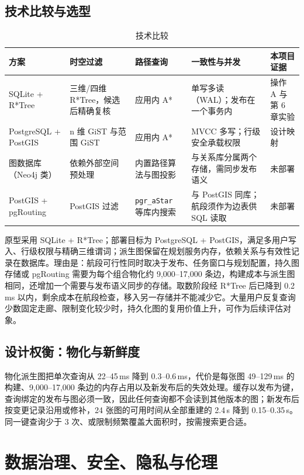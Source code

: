 \documentclass[a4paper,11pt,UTF8]{ctexart}
\begin{document}
\subsection{技术比较与选型}

\begin{table}[!htbp]\centering\small
\caption{技术比较}
\begin{tabularx}{\textwidth}{L{2.5cm}YYYL{2.2cm}}
\toprule
方案 & 时空过滤 & 路径查询 & 一致性与并发 & 本项目证据 \\
\midrule
SQLite + R*Tree & 三维/四维 R*Tree，候选后精确复核 & 应用内 A* & 单写多读（WAL）；发布在一个事务内 & 操作 A 与第 6 章实验 \\
PostgreSQL + PostGIS & n 维 GiST 与范围 GiST & 应用内 A* & MVCC 多写；行级安全承载权限 & 设计映射 \\
图数据库（Neo4j 类） & 依赖外部空间预处理 & 内置路径算法与图投影 \cite{neo4j} & 与关系库分属两个存储，需同步发布语义 & 未部署 \\
PostGIS + pgRouting & PostGIS 过滤 & \texttt{pgr\_aStar} 等库内搜索 \cite{pgrouting} & 与 PostGIS 同库；航段须作为边表供 SQL 读取 & 未部署 \\
\bottomrule
\end{tabularx}
\end{table}

原型采用 SQLite + R*Tree；部署目标为 PostgreSQL + PostGIS，满足多用户写入、行级权限与精确三维谓词；派生图保留在规划服务内存，依赖关系与有效性记录在数据库。理由是：航段可行性同时取决于发布、任务窗口与规划配置，持久图存储或 pgRouting 需要为每个组合物化约 9,000–17,000 条边，构建成本与派生图相同，还增加一个需要与发布语义同步的存储。取数阶段经 R*Tree 后已降到 0.2\,ms 以内，剩余成本在航段检查，移入另一存储并不能减少它。大量用户反复查询少数固定走廊、限制变化较少时，持久化图的复用价值上升，可作为后续评估对象。

\subsection{设计权衡：物化与新鲜度}

物化派生图把单次查询从 22–45\,ms 降到 0.3–0.6\,ms，代价是每张图 49–129\,ms 的构建、9,000–17,000 条边的内存占用以及新发布后的失效处理。缓存以发布为键，查询绑定的发布与图必须一致，因此任何查询都不会读到其他版本的图；新发布后按变更记录沿用或修补，24 张图的可用时间从全部重建的 2.4\,s 降到 0.15–0.35\,s。同一键查询少于 3 次、或限制频繁覆盖大面积时，按需搜索更合适。

\section{数据治理、安全、隐私与伦理}\label{sec:gov}
\end{document}
